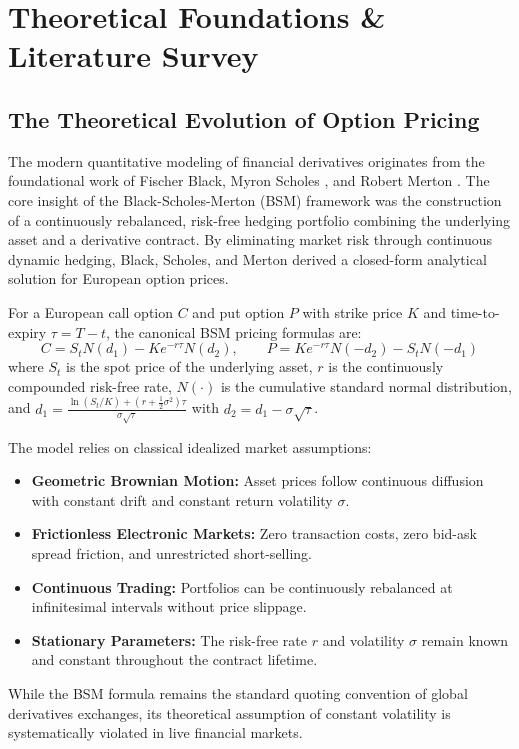 \chapter{Theoretical Foundations \& Literature Survey}
\label{chap:literature_survey}

\section{The Theoretical Evolution of Option Pricing}
\label{sec:option_pricing_evolution}

The modern quantitative modeling of financial derivatives originates from the foundational work of Fischer Black, Myron Scholes \cite{black1973pricing}, and Robert Merton \cite{merton1973theory}. The core insight of the Black-Scholes-Merton (BSM) framework was the construction of a continuously rebalanced, risk-free hedging portfolio combining the underlying asset and a derivative contract. By eliminating market risk through continuous dynamic hedging, Black, Scholes, and Merton derived a closed-form analytical solution for European option prices.

For a European call option $C$ and put option $P$ with strike price $K$ and time-to-expiry $\tau = T - t$, the canonical BSM pricing formulas are:
\begin{equation}
    C = S_t N(d_1) - K e^{-r\tau} N(d_2), \qquad P = K e^{-r\tau} N(-d_2) - S_t N(-d_1)
    \label{eq:bsm_call_lit}
\end{equation}
where $S_t$ is the spot price of the underlying asset, $r$ is the continuously compounded risk-free rate, $N(\cdot)$ is the cumulative standard normal distribution, and $d_1 = \frac{\ln(S_t / K) + (r + \frac{1}{2}\sigma^2)\tau}{\sigma \sqrt{\tau}}$ with $d_2 = d_1 - \sigma \sqrt{\tau}$.

The model relies on classical idealized market assumptions:
\begin{itemize}\setlength{\itemsep}{0pt}\setlength{\parskip}{0pt}
    \item \textbf{Geometric Brownian Motion:} Asset prices follow continuous diffusion with constant drift and constant return volatility $\sigma$.
    \item \textbf{Frictionless Electronic Markets:} Zero transaction costs, zero bid-ask spread friction, and unrestricted short-selling.
    \item \textbf{Continuous Trading:} Portfolios can be continuously rebalanced at infinitesimal intervals without price slippage.
    \item \textbf{Stationary Parameters:} The risk-free rate $r$ and volatility $\sigma$ remain known and constant throughout the contract lifetime.
\end{itemize}
While the BSM formula remains the standard quoting convention of global derivatives exchanges, its theoretical assumption of constant volatility is systematically violated in live financial markets.

